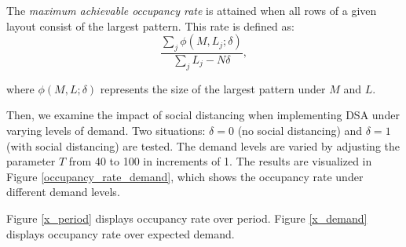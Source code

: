 The \textit{maximum achievable occupancy rate} is attained when all rows of a given layout consist of the largest pattern. This rate is defined as:
$$\frac{\sum_{j}\phi(M, L_{j}; \delta)}{\sum_{j} L_{j}- N \delta},$$

where $\phi(M, L; \delta)$ represents the size of the largest pattern under $M$ and $L$. 

Then, we examine the impact of social distancing when implementing DSA under varying levels of demand. Two situations: $\delta =0$ (no social distancing) and $\delta = 1$ (with social distancing) are tested. The demand levels are varied by adjusting the parameter $T$ from 40 to 100 in increments of 1. The results are visualized in Figure \ref{occupancy_rate_demand}, which shows the occupancy rate under different demand levels.




Figure \ref{x_period} displays occupancy rate over period. Figure \ref{x_demand} displays occupancy rate over expected demand. 






